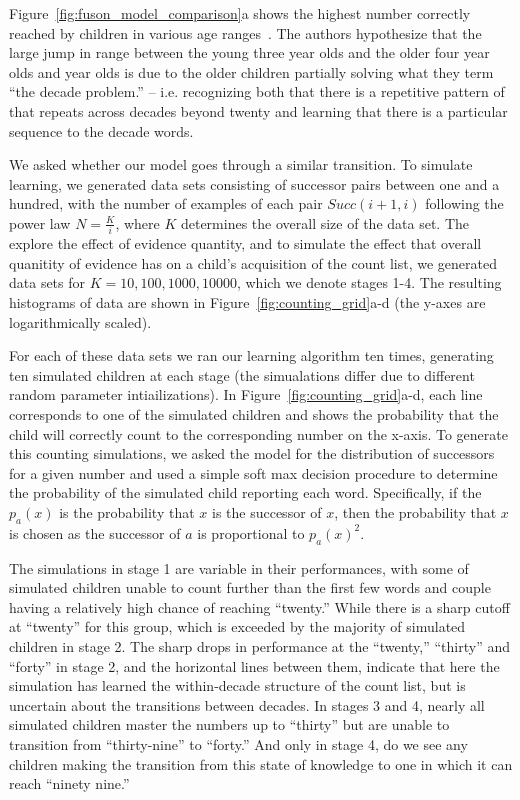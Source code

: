 \documentclass[10pt,letterpaper]{article}
\begin{document}
Figure~\ref{fig:fuson_model_comparison}a shows the highest number
correctly reached by children in various age
ranges~\cite{FusRicBriar1982}. The authors hypothesize that the large
jump in range between the young three year olds and the older four
year olds and year olds is due to the older children partially solving
what they term ``the decade problem.'' -- i.e. recognizing both that
there is a repetitive pattern of that repeats across decades beyond
twenty and learning that there is a particular sequence to the decade
words.

We asked whether our model goes through a similar transition. To
simulate learning, we generated data sets consisting of successor
pairs between one and a hundred, with the number of examples of each
pair $Succ(i+1, i)$ following the power law $N=\frac{K}{i}$, where $K$
determines the overall size of the data set. The explore the effect of
evidence quantity, and to simulate the effect that overall quanitity
of evidence has on a child's acquisition of the count list, we
generated data sets for $K=10, 100, 1000, 10000$, which we denote
stages 1-4. The resulting histograms of data are shown in
Figure~\ref{fig:counting_grid}a-d (the y-axes are logarithmically
scaled).

For each of these data sets we ran our learning algorithm ten times,
generating ten simulated children at each stage (the simualations
differ due to different random parameter intiailizations). In
Figure~\ref{fig:counting_grid}a-d, each line corresponds to one of the
simulated children and shows the probability that the child will
correctly count to the corresponding number on the x-axis. To generate
this counting simulations, we asked the model for the distribution of
successors for a given number and used a simple soft max decision
procedure to determine the probability of the simulated child
reporting each word. Specifically, if the $p_a(x)$ is the probability
that $x$ is the successor of $x$, then the probability that $x$ is
chosen as the successor of $a$ is proportional to $p_a(x)^2$.

The simulations in stage 1 are variable in their performances, with
some of simulated children unable to count further than the first few
words and couple having a relatively high chance of reaching
``twenty.'' While there is a sharp cutoff at ``twenty'' for this
group, which is exceeded by the majority of simulated children in
stage 2. The sharp drops in performance at the ``twenty,'' ``thirty''
and ``forty'' in stage 2, and the horizontal lines between them,
indicate that here the simulation has learned the within-decade
structure of the count list, but is uncertain about the transitions
between decades. In stages 3 and 4, nearly all simulated children
master the numbers up to ``thirty'' but are unable to transition from
``thirty-nine'' to ``forty.'' And only in stage 4, do we see any
children making the transition from this state of knowledge to one in
which it can reach ``ninety nine.'' 
\end{document}
